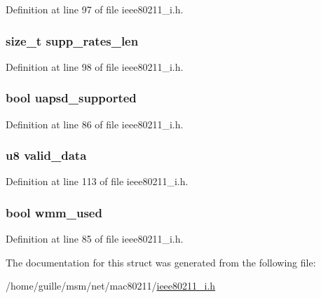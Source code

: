 Definition at line 97 of file ieee80211\-\_\-i.\-h.

\hypertarget{structieee80211__bss_aa6efda8d2063cb2f8ef7e00b43b1954d}{
\subsubsection[{supp\-\_\-rates\-\_\-len}]{\setlength{\rightskip}{0pt plus 5cm}size\-\_\-t supp\-\_\-rates\-\_\-len}}\label{structieee80211__bss_aa6efda8d2063cb2f8ef7e00b43b1954d}


Definition at line 98 of file ieee80211\-\_\-i.\-h.

\hypertarget{structieee80211__bss_a4dff539e426e32e9bb2253d826f04529}{
\subsubsection[{uapsd\-\_\-supported}]{\setlength{\rightskip}{0pt plus 5cm}bool uapsd\-\_\-supported}}\label{structieee80211__bss_a4dff539e426e32e9bb2253d826f04529}


Definition at line 86 of file ieee80211\-\_\-i.\-h.

\hypertarget{structieee80211__bss_acaa86d140b076b0a86f9476ec8653c1f}{
\subsubsection[{valid\-\_\-data}]{\setlength{\rightskip}{0pt plus 5cm}u8 valid\-\_\-data}}\label{structieee80211__bss_acaa86d140b076b0a86f9476ec8653c1f}


Definition at line 113 of file ieee80211\-\_\-i.\-h.

\hypertarget{structieee80211__bss_aebf73ffff3e743095dbc5613cf287640}{
\subsubsection[{wmm\-\_\-used}]{\setlength{\rightskip}{0pt plus 5cm}bool wmm\-\_\-used}}\label{structieee80211__bss_aebf73ffff3e743095dbc5613cf287640}


Definition at line 85 of file ieee80211\-\_\-i.\-h.



The documentation for this struct was generated from the following file\-:\begin{DoxyCompactItemize}
\item 
/home/guille/msm/net/mac80211/\hyperlink{ieee80211__i_8h}{ieee80211\-\_\-i.\-h}\end{DoxyCompactItemize}

